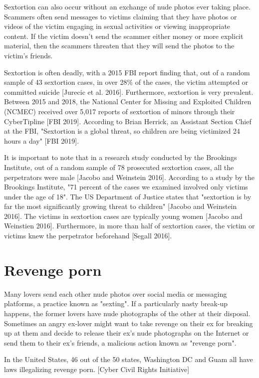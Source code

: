 \documentclass[class=book, crop=false]{standalone}
\begin{document}
Sextortion can also occur without an exchange of nude photos ever taking place. Scammers often send messages to victims claiming that they have photos or videos of the victim engaging in sexual activities or viewing inappropriate content. If the victim doesn't send the scammer either money or more explicit material, then the scammers threaten that they will send the photos to the victim's friends.

Sextortion is often deadly, with a 2015 FBI report finding that, out of a random sample of 43 sextortion cases, in over 28\% of the cases, the victim attempted or committed suicide [Jurecic et al. 2016]. Furthermore, sextortion is very prevalent. Between 2015 and 2018, the National Center for Missing and Exploited Children (NCMEC) received over 5,017 reports of sextortion of minors through their CyberTipline [FBI 2019]. According to Brian Herrick, an Assistant Section Chief at the FBI, "Sextortion is a global threat, so children are being victimized 24 hours a day" [FBI 2019].

It is important to note that in a research study conducted by the Brookings Institute, out of a random sample of 78 prosecuted sextortion cases, all the perpetrators were male [Jacobo and Weinstein 2016]. According to a study by the Brookings Institute, "71 percent of the cases we examined involved only victims under the age of 18". The US Department of Justice states that "sextortion is by far the most significantly growing threat to children" [Jacobo and Weinstein 2016]. The victims in sextortion cases are typically young women [Jacobo and Weinstien 2016]. Furthermore, in more than half of sextortion cases, the victim or victims knew the perpetrator beforehand [Segall 2016].

\section{Revenge porn}

Many lovers send each other nude photos over social media or messaging platforms, a practice known as "sexting". If a particularly nasty break-up happens, the former lovers have nude photographs of the other at their disposal. Sometimes an angry ex-lover might want to take revenge on their ex for breaking up at them and decide to release their ex's nude photographs on the Internet or send them to their ex's friends, a malicious action known as "revenge porn".

In the United States, 46 out of the 50 states, Washington DC and Guam all have laws illegalizing revenge porn. [Cyber Civil Rights Initiative]
\end{document}
